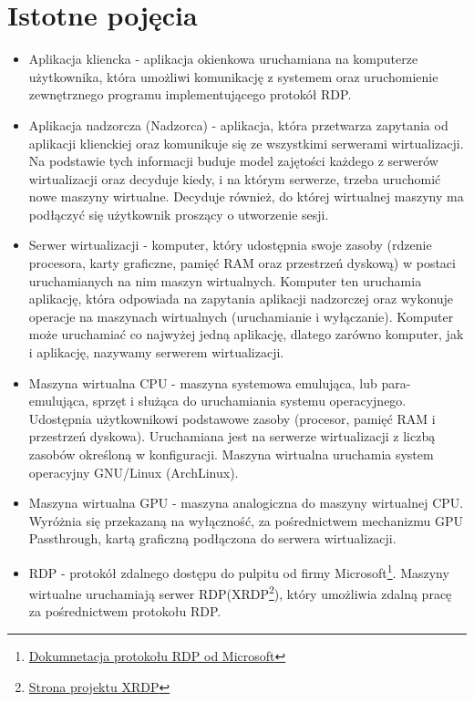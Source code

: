 \documentclass[../praca-dyplomowa.tex]{subfiles}
\begin{document}
\section{Istotne pojęcia}

\begin{itemize}
    \item Aplikacja kliencka - aplikacja okienkowa uruchamiana na komputerze użytkownika, która umożliwi komunikację z systemem oraz uruchomienie zewnętrznego programu implementującego protokół RDP.
    \item Aplikacja nadzorcza (Nadzorca) - aplikacja, która przetwarza zapytania od aplikacji klienckiej oraz komunikuje się ze wszystkimi serwerami wirtualizacji. Na podstawie tych informacji buduje model zajętości każdego z serwerów wirtualizacji oraz decyduje kiedy, i na którym serwerze, trzeba uruchomić nowe maszyny wirtualne. Decyduje również, do której wirtualnej maszyny ma podłączyć się użytkownik proszący o utworzenie sesji.
    \item Serwer wirtualizacji - komputer, który udostępnia swoje zasoby (rdzenie procesora, karty graficzne, pamięć RAM oraz przestrzeń dyskową) w postaci uruchamianych na nim maszyn wirtualnych. Komputer ten uruchamia aplikację, która odpowiada na zapytania aplikacji nadzorczej oraz wykonuje operacje na maszynach wirtualnych (uruchamianie i wyłączanie). Komputer może uruchamiać co najwyżej jedną aplikację, dlatego zarówno komputer, jak i aplikację, nazywamy serwerem wirtualizacji.
    \item Maszyna wirtualna CPU - maszyna systemowa emulująca, lub para-emulująca, sprzęt i służąca do uruchamiania systemu operacyjnego. Udostępnia użytkownikowi podstawowe zasoby (procesor, pamięć RAM i przestrzeń dyskowa). Uruchamiana jest na serwerze wirtualizacji z liczbą zasobów określoną w konfiguracji. Maszyna wirtualna uruchamia system operacyjny GNU/Linux (ArchLinux).
    \item Maszyna wirtualna GPU - maszyna analogiczna do maszyny wirtualnej CPU. Wyróżnia się przekazaną na wyłączność, za pośrednictwem mechanizmu GPU Passthrough, kartą graficzną podłączona do serwera wirtualizacji.
    \item RDP - protokół zdalnego dostępu do pulpitu od firmy Microsoft\footnote{\href{https://docs.microsoft.com/en-us/troubleshoot/windows-server/remote/understanding-remote-desktop-protocol}{Dokumnetacja protokołu RDP od Microsoft}}. Maszyny wirtualne uruchamiają serwer RDP(XRDP\footnote{\href{http://xrdp.org/}{Strona projektu XRDP}}), który umożliwia zdalną pracę za pośrednictwem protokołu RDP.

\end{itemize}
\end{document}
